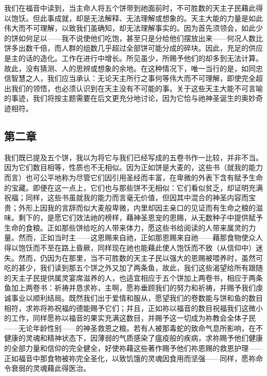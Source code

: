 \par

我们在福音中读到，当主命人将五个饼带到祂面前时，不可胜数的天主子民藉此得以饱饫。但此事成就，却是无法解释、无法理解或想象的。天主大能的力量是如此伟大而不可理解，以致我们虽确知，却无法理解事实的。因为首先须领会，如此少的饼如何足以——我不说使他们吃饱，甚至只是分给他们摆放出来——何况人数比饼多出数千倍，而人群的组数几乎超过全部饼可能分成的碎块。因此，充足的供应是主的话的造化。工作在进行中增长。所见虽少，所赐予他们的却多到无法计算。故此，没有猜测、人的思辨或想象的余地。在这种情况下，唯一当行的是，如同忠信智慧之人，我们应当承认：无论天主所行之事何等伟大而不可理解，即使完全超出我们的领悟，也必须认识到在天主没有不可能的事。关于这些天主大能不可言喻的事迹，我们将按主题需要在后文更充分地讨论，因为它恰与祂神圣诞生的奥妙奇迹相符。\par


\subsection{第二章}

\par

我们既已提及五个饼，我以为将它与我们已经写成的五卷书作一比较，并非不当。因为它们数目相等，性质也不无相似。因为正如饼是大麦的，这些书（就我的能力而言）也可公平地称为尽管它们因引用圣经而丰富，在卑微的外表下含有赋予生命的宝藏。即便在这一点上，它们也与那些饼不无相似：它们看似贫乏，却证明充满祝福；同样，这些书虽就我的能力而言毫无价值，但因其中混合的神圣内容而宝贵；外形上因我的言辞而似大麦般卑微，内里却因主亲口的见证而有生命之粮的滋味。剩下的，是愿它们效法祂的榜样，藉神圣恩宠的恩赐，从无数种子中提供赋予生命的食粮。正如那些饼给吃的人带来体力，愿这些书给阅读的人带来属灵的力量。然而，正如当时主——这恩赐来自祂，正如那恩赐来自祂——藉那食物使众人得以饱饫而不至在路上昏厥，同样现在祂也能藉此使人饱饫而不致（从信仰中）迷失。然而，仍因为在那里，当不可胜数的天主子民以强大的恩赐被喂养时，虽然可吃的甚少，我们读到那五个饼之外又加了两条鱼，故此，我们这些渴望给所有跟随的天主子民提供属灵宴席滋养的人，也适宜相应于五个饼加上两卷书，相应于两条鱼加上两卷书：祈祷并恳求祢，主啊，愿祢垂顾我们的努力和祈祷，并赐予我们虔诚事业以顺利结局。既然我们出于爱情和服从，愿望我们的卷数能与饼和鱼的数目相符，求祢将祢祝福的德能赐予它们；并且，正如祢以福音的数目祝福我们这微小的工作，同样愿祢以福音的果实充满这数目，并赐予这一切成为祢教会全体子民——无论年龄性别——的神圣救恩之粮。若有人被那毒蛇的致命气息所影响，在不健康的灵魂和精神状态下，因薄弱的气质感染了瘟疫般的疾病，求祢赐予他们健康的全部力量和信仰的完全健全，好使祢藉这些著作赐予他们祢恩赐的救恩护理——正如福音中那食物被祢完全圣化，以致饥饿的灵魂因食用而坚强——同样，愿祢命令衰弱的灵魂藉此得医治。\par

